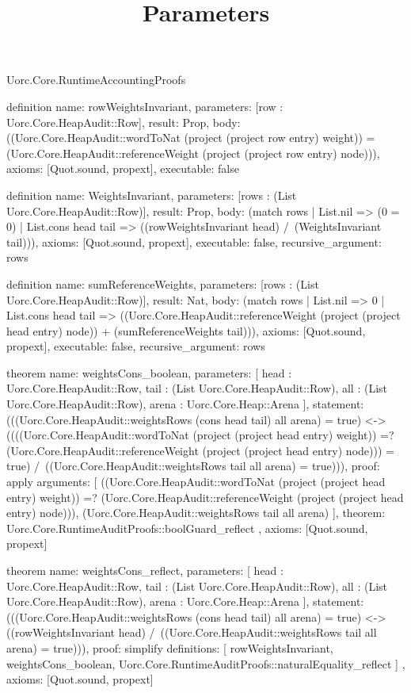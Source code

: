 \begin{lexlean}{Uorc.Core.RuntimeAccountingProofs}
\title{Parameters}
\begin{semanticmodule}
definition{
  name: rowWeightsInvariant,
  parameters: [row : Uorc.Core.HeapAudit::Row],
  result: Prop,
  body: ((Uorc.Core.HeapAudit::wordToNat (project (project row entry) weight)) = (Uorc.Core.HeapAudit::referenceWeight (project (project row entry) node))),
  axioms: [Quot.sound, propext],
  executable: false
}

definition{
  name: WeightsInvariant,
  parameters: [rows : (List Uorc.Core.HeapAudit::Row)],
  result: Prop,
  body: (match rows
    | List.nil => (0 = 0)
    | List.cons head tail => ((rowWeightsInvariant head) /\ (WeightsInvariant tail))),
  axioms: [Quot.sound, propext],
  executable: false,
  recursive_argument: rows
}

definition{
  name: sumReferenceWeights,
  parameters: [rows : (List Uorc.Core.HeapAudit::Row)],
  result: Nat,
  body: (match rows
    | List.nil => 0
    | List.cons head tail => ((Uorc.Core.HeapAudit::referenceWeight (project (project head entry) node)) + (sumReferenceWeights tail))),
  axioms: [Quot.sound, propext],
  executable: false,
  recursive_argument: rows
}

theorem{
  name: weightsCons_boolean,
  parameters: [
    head : Uorc.Core.HeapAudit::Row,
    tail : (List Uorc.Core.HeapAudit::Row),
    all : (List Uorc.Core.HeapAudit::Row),
    arena : Uorc.Core.Heap::Arena
  ],
  statement: (((Uorc.Core.HeapAudit::weightsRows (cons head tail) all arena) = true) <-> ((((Uorc.Core.HeapAudit::wordToNat (project (project head entry) weight)) =? (Uorc.Core.HeapAudit::referenceWeight (project (project head entry) node))) = true) /\ ((Uorc.Core.HeapAudit::weightsRows tail all arena) = true))),
  proof: apply{
    arguments: [
      ((Uorc.Core.HeapAudit::wordToNat (project (project head entry) weight)) =? (Uorc.Core.HeapAudit::referenceWeight (project (project head entry) node))),
      (Uorc.Core.HeapAudit::weightsRows tail all arena)
    ],
    theorem: Uorc.Core.RuntimeAuditProofs::boolGuard_reflect
  },
  axioms: [Quot.sound, propext]
}

theorem{
  name: weightsCons_reflect,
  parameters: [
    head : Uorc.Core.HeapAudit::Row,
    tail : (List Uorc.Core.HeapAudit::Row),
    all : (List Uorc.Core.HeapAudit::Row),
    arena : Uorc.Core.Heap::Arena
  ],
  statement: (((Uorc.Core.HeapAudit::weightsRows (cons head tail) all arena) = true) <-> ((rowWeightsInvariant head) /\ ((Uorc.Core.HeapAudit::weightsRows tail all arena) = true))),
  proof: simplify{
    definitions: [
      rowWeightsInvariant,
      weightsCons_boolean,
      Uorc.Core.RuntimeAuditProofs::naturalEquality_reflect
    ]
  },
  axioms: [Quot.sound, propext]
}


\end{semanticmodule}
\end{lexlean}
